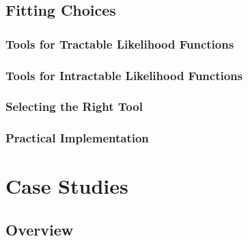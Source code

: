 \documentclass{article}
\begin{document}

\subsection{Fitting Choices}

\subsubsection{Tools for Tractable Likelihood Functions}

\subsubsection{Tools for Intractable Likelihood Functions}

\subsubsection{Selecting the Right Tool}

\subsubsection{Practical Implementation}

\section{Case Studies}

\subsection{Overview}
\end{document}
